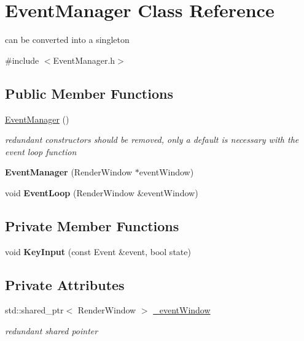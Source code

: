 \hypertarget{class_event_manager}{}\section{Event\+Manager Class Reference}
\label{class_event_manager}


can be converted into a singleton  




{\ttfamily \#include $<$Event\+Manager.\+h$>$}

\subsection*{Public Member Functions}
\begin{DoxyCompactItemize}
\item 
\mbox{\label{class_event_manager_a89099b22114f158b5c530edfea52371d}} 
\hyperlink{class_event_manager_a89099b22114f158b5c530edfea52371d}{Event\+Manager} ()
\begin{DoxyCompactList}\small\item\em redundant constructors should be removed, only a default is necessary with the event loop function \end{DoxyCompactList}\item 
\mbox{\label{class_event_manager_a8951d1cf3aabe678cd37c64317497519}} 
{\bfseries Event\+Manager} (Render\+Window $\ast$event\+Window)
\item 
\mbox{\label{class_event_manager_a3e90c3658f1fc88b45ba1b8fda4f2c10}} 
void {\bfseries Event\+Loop} (Render\+Window \&event\+Window)
\end{DoxyCompactItemize}
\subsection*{Private Member Functions}
\begin{DoxyCompactItemize}
\item 
\mbox{\label{class_event_manager_a279b1d4e14cd98c1b3789a5276be2b3a}} 
void {\bfseries Key\+Input} (const Event \&event, bool state)
\end{DoxyCompactItemize}
\subsection*{Private Attributes}
\begin{DoxyCompactItemize}
\item 
\mbox{\label{class_event_manager_a1909a88890831dfd326b4a9032c48ac2}} 
std\+::shared\+\_\+ptr$<$ Render\+Window $>$ \hyperlink{class_event_manager_a1909a88890831dfd326b4a9032c48ac2}{\+\_\+event\+Window}
\begin{DoxyCompactList}\small\item\em redundant shared pointer \end{DoxyCompactList}\end{DoxyCompactItemize}


